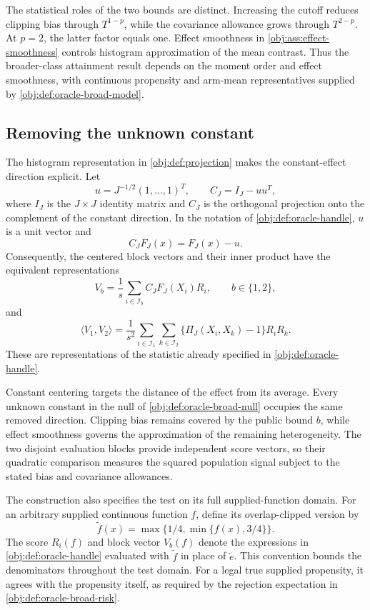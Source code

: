 \documentclass[11pt]{article}
\begin{document}
The statistical roles of the two bounds are distinct. Increasing the cutoff reduces clipping bias through \(T^{1-p}\), while the covariance allowance grows through \(T^{2-p}\). At \(p=2\), the latter factor equals one. Effect smoothness in \cref{obj:ass:effect-smoothness} controls histogram approximation of the mean contrast. Thus the broader-class attainment result depends on the moment order and effect smoothness, with continuous propensity and arm-mean representatives supplied by \cref{obj:def:oracle-broad-model}.

\subsection{Removing the unknown constant}

The histogram representation in \cref{obj:def:projection} makes the constant-effect direction explicit. Let
\[
u=J^{-1/2}(1,\ldots,1)^T,
\qquad
C_J=I_J-uu^T,
\]
where \(I_J\) is the \(J\times J\) identity matrix and \(C_J\) is the orthogonal projection onto the complement of the constant direction. In the notation of \cref{obj:def:oracle-handle}, \(u\) is a unit vector and
\[
C_JF_J(x)=F_J(x)-u.
\]
Consequently, the centered block vectors and their inner product have the equivalent representations
\[
V_b=\frac1s\sum_{i\in\mathcal I_b}C_JF_J(X_i)R_i,
\qquad b\in\{1,2\},
\]
and
\[
\langle V_1,V_2\rangle
=
\frac1{s^2}
\sum_{i\in\mathcal I_1}\sum_{k\in\mathcal I_2}
\bigl\{\Pi_J(X_i,X_k)-1\bigr\}R_iR_k.
\]
These are representations of the statistic already specified in \cref{obj:def:oracle-handle}.

Constant centering targets the distance of the effect from its average. Every unknown constant in the null of \cref{obj:def:oracle-broad-null} occupies the same removed direction. Clipping bias remains covered by the public bound \(b\), while effect smoothness governs the approximation of the remaining heterogeneity. The two disjoint evaluation blocks provide independent score vectors, so their quadratic comparison measures the squared population signal subject to the stated bias and covariance allowances.

The construction also specifies the test on its full supplied-function domain. For an arbitrary supplied continuous function \(f\), define its overlap-clipped version by
\[
\widetilde f(x)=\max\{1/4,\min\{f(x),3/4\}\}.
\]
The score \(R_i(f)\) and block vector \(V_b(f)\) denote the expressions in \cref{obj:def:oracle-handle} evaluated with \(\widetilde f\) in place of \(\widetilde e\). This convention bounds the denominators throughout the test domain. For a legal true supplied propensity, it agrees with the propensity itself, as required by the rejection expectation in \cref{obj:def:oracle-broad-risk}.
\end{document}
